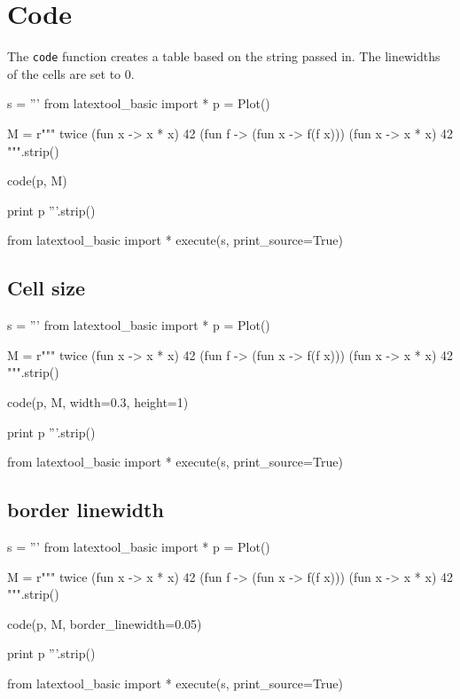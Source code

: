 \section{Code}

The \verb!code! function creates a table based on the string passed in.
The linewidths of the cells are set to 0.

\begin{python}
s = '''
from latextool_basic import *
p = Plot()

M = r"""
twice (fun x -> x * x) 42
(fun f -> (fun x -> f(f x))) (fun x -> x * x) 42
""".strip()
    
code(p, M)

print p
'''.strip()

from latextool_basic import *
execute(s, print_source=True)
\end{python}




\newpage
\subsection{Cell size}
\begin{python}
s = '''
from latextool_basic import *
p = Plot()

M = r"""
twice (fun x -> x * x) 42
(fun f -> (fun x -> f(f x))) (fun x -> x * x) 42
""".strip()
    
code(p, M, width=0.3, height=1)

print p
'''.strip()

from latextool_basic import *
execute(s, print_source=True)
\end{python}




\newpage
\subsection{border linewidth}

\begin{python}
s = '''
from latextool_basic import *
p = Plot()

M = r"""
twice (fun x -> x * x) 42
(fun f -> (fun x -> f(f x))) (fun x -> x * x) 42
""".strip()
    
code(p, M, border_linewidth=0.05)

print p
'''.strip()

from latextool_basic import *
execute(s, print_source=True)
\end{python}




